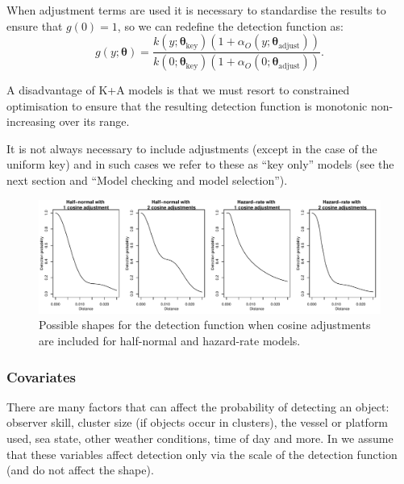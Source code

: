 \documentclass[article]{jss}
\begin{document}
When adjustment terms are used it is necessary to standardise the
results to ensure that \(g(0)=1\), so we can redefine the detection
function as: \[
g(y; \boldsymbol{\theta}) = \frac{k(y; \boldsymbol{\theta}_\text{key})\left( 1+ \alpha_O(y; \boldsymbol{\theta}_\text{adjust})\right)}{k(0; \boldsymbol{\theta}_\text{key})\left( 1+ \alpha_O(0; \boldsymbol{\theta}_\text{adjust})\right)}.
\]

A disadvantage of K+A models is that we must resort to constrained
optimisation \citep[via the  package;][]{rsolnp-pkg} to
ensure that the resulting detection function is monotonic non-increasing
over its range.

It is not always necessary to include adjustments (except in the case of
the uniform key) and in such cases we refer to these as ``key only''
models (see the next section and ``Model checking and model
selection'').

\begin{CodeChunk}
\begin{figure}

{\centering \includegraphics{paper_files/figure-latex/adjust-mix-comp-1} 

}

\caption{Possible shapes for the detection function when cosine adjustments are included for half-normal and hazard-rate models.\label{fig:keyadj}}\label{fig:adjust-mix-comp}
\end{figure}
\end{CodeChunk}

\subsubsection{Covariates}\label{covariates}

There are many factors that can affect the probability of detecting an
object: observer skill, cluster size (if objects occur in clusters), the
vessel or platform used, sea state, other weather conditions, time of
day and more. In  we assume that these variables affect
detection only via the scale of the detection function (and do not
affect the shape).
\end{document}
